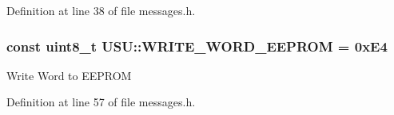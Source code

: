 \-Definition at line 38 of file messages.\-h.

\hypertarget{namespace_u_s_u_a483eb9b7abe528d9fe3e843b4655a977}{
\subsubsection[{\-W\-R\-I\-T\-E\-\_\-\-W\-O\-R\-D\-\_\-\-E\-E\-P\-R\-O\-M}]{\setlength{\rightskip}{0pt plus 5cm}const uint8\-\_\-t {\bf \-U\-S\-U\-::\-W\-R\-I\-T\-E\-\_\-\-W\-O\-R\-D\-\_\-\-E\-E\-P\-R\-O\-M} = 0x\-E4}}\label{namespace_u_s_u_a483eb9b7abe528d9fe3e843b4655a977}
\-Write \-Word to \-E\-E\-P\-R\-O\-M 

\-Definition at line 57 of file messages.\-h.

